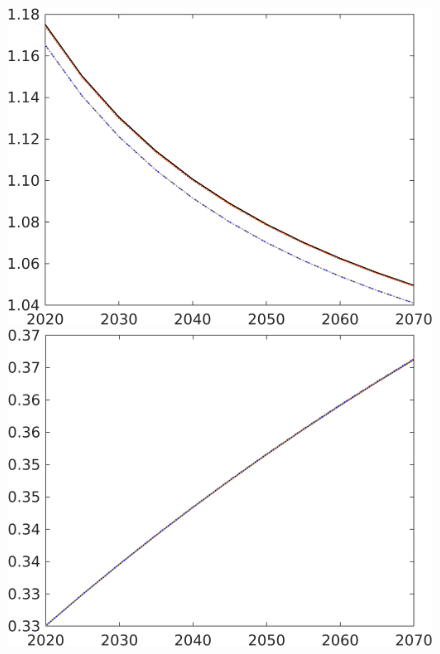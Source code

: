 \begin{figure}[h!!]
\begin{minipage}[]{0.32\textwidth}
	\end{minipage}
	\begin{minipage}[]{0.32\textwidth}
		\includegraphics[width=1\textwidth]{../../codding_model/own_basedOnFried/optimalPol_190722_tidiedUp/figures/all_10Aout22/CountNskTaulLF_target_pg_spillover0_sep1_extern0_PV1_etaa0.79_lgd0.png}
	\end{minipage}
	\begin{minipage}[]{0.32\textwidth}
		\includegraphics[width=1\textwidth]{../../codding_model/own_basedOnFried/optimalPol_190722_tidiedUp/figures/all_10Aout22/CountNskTaulLF_target_pf_spillover0_sep1_extern0_PV1_etaa0.79_lgd0.png}

\end{minipage}
\end{figure}
